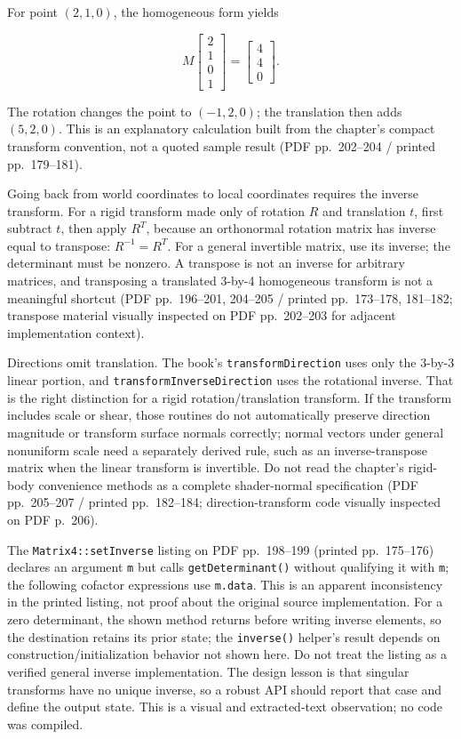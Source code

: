For point \((2,1,0)\), the homogeneous form yields

\[
M\begin{bmatrix}2\\1\\0\\1\end{bmatrix}=\begin{bmatrix}4\\4\\0\end{bmatrix}.
\]

The rotation changes the point to \((-1,2,0)\); the translation then adds \((5,2,0)\). This is an explanatory calculation built from the chapter's compact transform convention, not a quoted sample result (PDF pp.~202--204 / printed pp.~179--181).

Going back from world coordinates to local coordinates requires the inverse transform. For a rigid transform made only of rotation \(R\) and translation \(t\), first subtract \(t\), then apply \(R^T\), because an orthonormal rotation matrix has inverse equal to transpose: \(R^{-1}=R^T\). For a general invertible matrix, use its inverse; the determinant must be nonzero. A transpose is not an inverse for arbitrary matrices, and transposing a translated 3-by-4 homogeneous transform is not a meaningful shortcut (PDF pp.~196--201, 204--205 / printed pp.~173--178, 181--182; transpose material visually inspected on PDF pp.~202--203 for adjacent implementation context).

Directions omit translation. The book's \texttt{transformDirection} uses only the 3-by-3 linear portion, and \texttt{transformInverseDirection} uses the rotational inverse. That is the right distinction for a rigid rotation/translation transform. If the transform includes scale or shear, those routines do not automatically preserve direction magnitude or transform surface normals correctly; normal vectors under general nonuniform scale need a separately derived rule, such as an inverse-transpose matrix when the linear transform is invertible. Do not read the chapter's rigid-body convenience methods as a complete shader-normal specification (PDF pp.~205--207 / printed pp.~182--184; direction-transform code visually inspected on PDF p.~206).

The \texttt{Matrix4::setInverse} listing on PDF pp.~198--199 (printed pp.~175--176) declares an argument \texttt{m} but calls \texttt{getDeterminant()} without qualifying it with \texttt{m}; the following cofactor expressions use \texttt{m.data}. This is an apparent inconsistency in the printed listing, not proof about the original source implementation. For a zero determinant, the shown method returns before writing inverse elements, so the destination retains its prior state; the \texttt{inverse()} helper's result depends on construction/initialization behavior not shown here. Do not treat the listing as a verified general inverse implementation. The design lesson is that singular transforms have no unique inverse, so a robust API should report that case and define the output state. This is a visual and extracted-text observation; no code was compiled.

